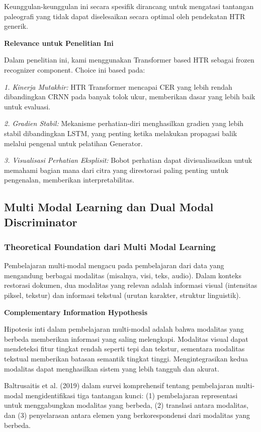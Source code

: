 \documentclass[12pt,a4paper]{article}
\begin{document}
Keunggulan-keunggulan ini secara spesifik dirancang untuk mengatasi tantangan paleografi yang tidak dapat diselesaikan secara optimal oleh pendekatan HTR generik.

\textbf{Relevance untuk Penelitian Ini}

Dalam penelitian ini, kami menggunakan Transformer based HTR sebagai frozen recognizer component. Choice ini based pada:

\textit{1. Kinerja Mutakhir:} HTR Transformer mencapai CER yang lebih rendah dibandingkan CRNN pada banyak tolok ukur, memberikan dasar yang lebih baik untuk evaluasi.

\textit{2. Gradien Stabil:} Mekanisme perhatian-diri menghasilkan gradien yang lebih stabil dibandingkan LSTM, yang penting ketika melakukan propagasi balik melalui pengenal untuk pelatihan Generator.

\textit{3. Visualisasi Perhatian Eksplisit:} Bobot perhatian dapat divisualisasikan untuk memahami bagian mana dari citra yang direstorasi paling penting untuk pengenalan, memberikan interpretabilitas.

\subsection{Multi Modal Learning dan Dual Modal Discriminator}
\label{subsec:multimodal-learning}

\subsubsection{Theoretical Foundation dari Multi Modal Learning}
\label{subsubsec:multimodal-theory}

Pembelajaran multi-modal mengacu pada pembelajaran dari data yang mengandung berbagai modalitas (misalnya, visi, teks, audio). Dalam konteks restorasi dokumen, dua modalitas yang relevan adalah informasi visual (intensitas piksel, tekstur) dan informasi tekstual (urutan karakter, struktur linguistik).

\textbf{Complementary Information Hypothesis}

Hipotesis inti dalam pembelajaran multi-modal adalah bahwa modalitas yang berbeda memberikan informasi yang saling melengkapi. Modalitas visual dapat mendeteksi fitur tingkat rendah seperti tepi dan tekstur, sementara modalitas tekstual memberikan batasan semantik tingkat tinggi. Mengintegrasikan kedua modalitas dapat menghasilkan sistem yang lebih tangguh dan akurat.

Baltrusaitis et al. (2019) dalam survei komprehensif tentang pembelajaran multi-modal mengidentifikasi tiga tantangan kunci: (1) pembelajaran representasi untuk menggabungkan modalitas yang berbeda, (2) translasi antara modalitas, dan (3) penyelarasan antara elemen yang berkorespondensi dari modalitas yang berbeda.
\end{document}
